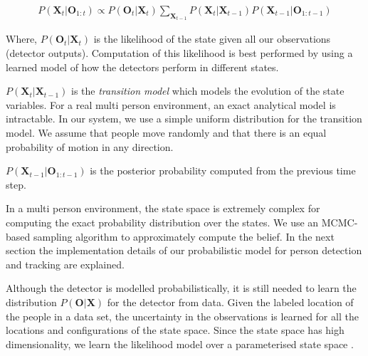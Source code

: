 
\begin{align}
P(\textbf{X}_{t} | \textbf{O}_{1:t}) \propto   P(\textbf{O}_{t} | \textbf{X}_{t}) \sum\limits_{\textbf{X}_{t-1}} P(\textbf{X}_{t}|\textbf{X}_{t-1}) P(\textbf{X}_{t-1}|\textbf{O}_{1:t-1}) \end{align} 




Where, $P(\textbf{O}_{t} | \textbf{X}_{t})$ is the likelihood of the state given all our observations (detector outputs). Computation of this likelihood is best performed by using a learned model of how the detectors perform in different states.

$P(\textbf{X}_{t}|\textbf{X}_{t-1})$ is the \textit{transition model} which models the evolution of the state variables. For a real multi person environment, an exact analytical model is intractable. In our system, we use a simple uniform distribution for the transition model. We assume that people move randomly and that there is an equal probability of motion in any direction. 

$P(\textbf{X}_{t-1}|\textbf{O}_{1:t-1})$ is the posterior probability computed from the previous time step.

In a multi person environment, the state space is extremely complex for computing the exact probability 
distribution over the states. We use an MCMC-based sampling algorithm to approximately compute the belief. In the next section the implementation details of our probabilistic model for person detection and tracking are explained.


Although the detector is modelled probabilistically, it is still needed to learn the distribution $P(\textbf{O}|\textbf{X})$ for the detector from data. Given the labeled location of the people in a data set, the uncertainty in the observations is learned for all the locations and configurations of the state space. Since the state space has high dimensionality, we learn the likelihood model over a parameterised state space \cite{berclaz-fleuret-fua-2008}.




